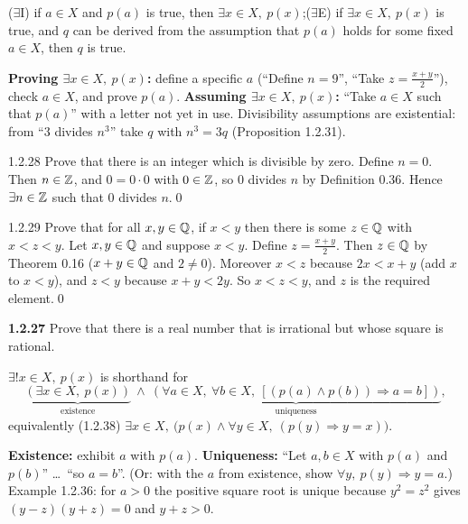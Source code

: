 \begin{key}
($\exists$I) if $a\in X$ and $p(a)$ is true, then $\exists x\in X,\ p(x)$;\quad ($\exists$E) if $\exists x\in X,\ p(x)$ is true, and $q$ can be derived from the assumption that $p(a)$ holds for some fixed $a\in X$, then $q$ is true.
\end{key}
\begin{strategy}
\textbf{Proving $\exists x\in X,\ p(x)$:} define a specific $a$ (``Define $n=9$'', ``Take $z=\frac{x+y}2$''), check $a\in X$, and prove $p(a)$. \textbf{Assuming $\exists x\in X,\ p(x)$:} ``Take $a\in X$ such that $p(a)$'' with a letter not yet in use. Divisibility assumptions are existential: from ``$3$ divides $n^3$'' take $q$ with $n^3=3q$ (Proposition 1.2.31).
\end{strategy}

\begin{bookex}[recommended]{1.2.28}
Prove that there is an integer which is divisible by zero.
\solution
Define $n=0$. Then $n\in\mathbb{Z}$, and $0=0\cdot0$ with $0\in\mathbb{Z}$, so $0$ divides $n$ by Definition 0.36. Hence $\exists n\in\mathbb{Z}$ such that $0$ divides $n$.\qed
\end{bookex}

\begin{bookex}{1.2.29}
Prove that for all $x,y\in\mathbb{Q}$, if $x<y$ then there is some $z\in\mathbb{Q}$ with $x<z<y$.
\solution
Let $x,y\in\mathbb{Q}$ and suppose $x<y$. Define $z=\frac{x+y}2$. Then $z\in\mathbb{Q}$ by Theorem 0.16 ($x+y\in\mathbb{Q}$ and $2\ne0$). Moreover $x<z$ because $2x<x+y$ (add $x$ to $x<y$), and $z<y$ because $x+y<2y$. So $x<z<y$, and $z$ is the required element.\qed
\end{bookex}

\begin{trybox}[{1.2.27 \fO}]
\textbf{1.2.27} Prove that there is a real number that is irrational but whose square is rational.
\end{trybox}

\begin{key}
$\exists!x\in X,\ p(x)$ is shorthand for
\[
\underbrace{(\exists x\in X,\ p(x))}_{\text{existence}}\ \wedge\ \underbrace{(\forall a\in X,\ \forall b\in X,\ [(p(a)\wedge p(b))\Rightarrow a=b])}_{\text{uniqueness}} ,
\]
equivalently (1.2.38) $\exists x\in X,\ \big(p(x)\wedge\forall y\in X,\ (p(y)\Rightarrow y=x)\big)$.
\end{key}
\begin{strategy}[{Strategy 1.2.35}]
\textbf{Existence:} exhibit $a$ with $p(a)$. \textbf{Uniqueness:} ``Let $a,b\in X$ with $p(a)$ and $p(b)$'' \dots\ ``so $a=b$''. (Or: with the $a$ from existence, show $\forall y,\ p(y)\Rightarrow y=a$.) Example 1.2.36: for $a>0$ the positive square root is unique because $y^2=z^2$ gives $(y-z)(y+z)=0$ and $y+z>0$.
\end{strategy}

